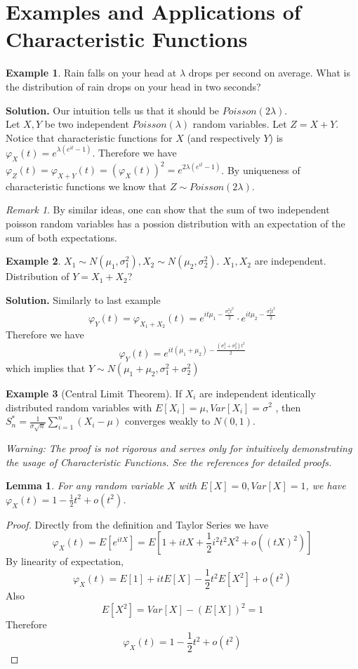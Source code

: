\documentclass{article}
\theoremstyle{definition}
\newtheorem{example}{Example}[section]
\theoremstyle{plain}
\newtheorem{lemma}{Lemma}[section]
\theoremstyle{remark}
\newtheorem*{remark}{Remark}
\begin{document}
\section{Examples and Applications of Characteristic Functions}
\begin{example}
	Rain falls on your head at $\lambda$ drops per second on average. What is the distribution of rain drops on your head in two seconds?
\end{example}
\noindent\textbf{Solution.}
Our intuition tells us that it should be $Poisson(2\lambda)$. \\
Let $X,Y$ be two independent $Poisson(\lambda)$ random variables. Let $Z=X+Y$.
Notice that characteristic functions for $X$ (and respectively $Y$) is $\varphi_X(t)=e^{\lambda(e^{it}-1)}$.
Therefore we have $\varphi_Z(t)=\varphi_{X+Y}(t)=(\varphi_X(t))^2=e^{2\lambda(e^{it}-1)}$. 
By uniqueness of characteristic functions we know that $Z\sim Poisson(2\lambda)$.
\begin{remark}
	By similar ideas, one can show that the sum of two independent poisson random variables has a possion distribution with an expectation of the sum of both expectations.
\end{remark}
\begin{example}
	$X_1\sim N(\mu_1,\sigma_1^2), X_2\sim N(\mu_2,\sigma_2^2).$ $X_1,X_2$ are independent. Distribution of $Y=X_1+X_2$?
\end{example}
\noindent\textbf{Solution.}
Similarly to last example $$\varphi_{Y}(t)=\varphi_{X_1+X_2}(t)=e^{it\mu_1-\frac{\sigma_1^2 t^2}{2}}\cdot e^{it\mu_2-\frac{\sigma_2^2 t^2}{2}}$$
Therefore we have $$\varphi_Y(t)=e^{it(\mu_1+\mu_2)-\frac{(\sigma_1^2+\sigma_2^2)t^2}{2}}$$
which implies that $Y\sim N(\mu_1+\mu_2,\sigma_1^2+\sigma_2^2)$
\begin{example}[Central Limit Theorem\cite{waterloo}]
	If $X_i$ are independent identically distributed random variables with $E[X_i] = \mu, Var[X_i] = \sigma^2$ , then $S_n^* = \frac1{\sigma\sqrt n}\sum_{i=1}^n(X_i-\mu)$ converges weakly to $N(0, 1)$.
\end{example}
\noindent\textit{Warning: The proof is not rigorous and serves only for intuitively demonstrating the usage of Characteristic Functions. See the references\cite{waterloo,nus} for detailed proofs.}
\begin{lemma}
	For any random variable $X$ with $E[X]=0,Var[X]=1$, we have $\varphi_X(t)=1-\frac12t^2+o(t^2)$.
	\label{lem:clt}
\end{lemma}
\begin{proof}
	Directly from the definition and Taylor Series we have
	$$\varphi_X(t)=E[e^{itX}]=E[1+itX+\frac{1}{2}i^2t^2X^2+o((tX)^2)]$$
	By linearity of expectation,
	$$\varphi_X(t)=E[1]+itE[X]-\frac{1}{2}t^2E[X^2]+o(t^2)$$
	Also
	$$E[X^2]=Var[X]-(E[X])^2=1$$
	Therefore $$\varphi_X(t)=1-\frac{1}{2}t^2+o(t^2)$$
\end{proof}
\end{document}
